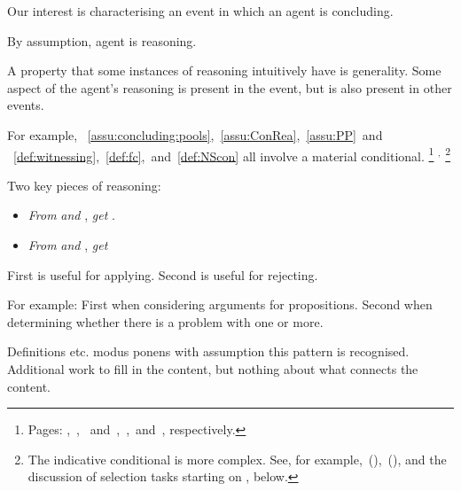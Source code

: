 \begin{note}
  Our interest is characterising an event in which an agent is concluding.

  By assumption, agent is reasoning.

  A property that some instances of reasoning intuitively have is generality.
  Some aspect of the agent's reasoning is present in the event, but is also present in other events.

  For example, ~\ref{assu:concluding:pools},~\ref{assu:ConRea},~\ref{assu:PP}~and ~\ref{def:witnessing},~\ref{def:fc},~and~\ref{def:NScon} all involve a material conditional.%
  \footnote{
    Pages: \pageref{assu:concluding:pools},~\pageref{assu:ConRea},~\pageref{assu:PP} and~\pageref{def:witnessing},~\pageref{def:fc},~and~\pageref{def:NScon}, respectively.
  }%
  \(^{,}\)%
  \footnote{
    The indicative conditional is more complex.
    See, for example,~(\cite{McGee:1985tz}),~(\cite{Kolodny:2010aa}), and the discussion of selection tasks starting on , below.
  }

  Two key pieces of reasoning:

  \begin{itemize}
  \item
    \emph{From}  \emph{and} , \emph{get} .
  \item
    \emph{From}  \emph{and} , \emph{get} 
  \end{itemize}

  First is useful for applying.
  Second is useful for rejecting.

  For example:
  First when considering arguments for propositions.
  Second when determining whether there is a problem with one or more.

  Definitions etc. modus ponens with assumption this pattern is recognised.
  Additional work to fill in the content, but nothing about what connects the content.
\end{note}

